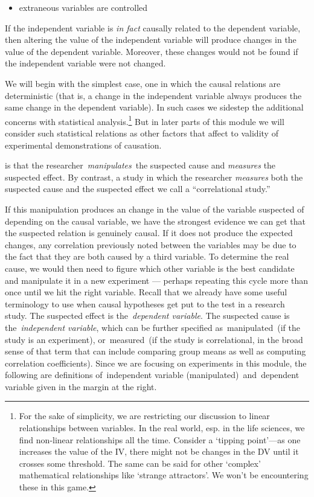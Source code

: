 \begin{refsection}
\begin{itemize}
\item extraneous variables are controlled

\end{itemize}

If the independent variable is \emph{in fact} causally related to the dependent variable, then altering the value of the independent variable will produce changes in the value of the dependent variable. Moreover, these changes would not be found if the independent variable were not changed.

We will begin with the simplest case, one in which the causal relations are deterministic (that is, a change in the independent variable always produces the same change in the dependent variable). In such cases we sidestep the additional concerns with statistical analysis.\footnote{For the sake of simplicity, we are restricting our discussion to linear relationships between variables. In the real world, esp. in the life sciences, we find non-linear relationships all the time. Consider a `tipping point'---as one increases the value of the IV, there might not be changes in the DV until it crosses some threshold. The same can be said for other `complex' mathematical relationships like `strange attractors'. We won't be encountering these in this game.} But in later parts of this module we will consider such statistical relations as other factors that affect to validity of experimental demonstrations of causation.

 is that the researcher \emph{manipulates} the suspected cause and \emph{measures} the suspected effect. By contrast, a study in which the researcher \emph{measures} both the suspected cause and the suspected effect we call a ``correlational study.'' 

If this manipulation produces an change in the value of the variable suspected of depending on the causal variable, we have the strongest evidence we can get that the suspected relation is genuinely causal. If it does not produce the expected changes, any correlation previously noted between the variables may be due to the fact that they are both caused by a third variable. To determine the real cause, we would then need to figure which other variable is the best candidate and manipulate it in a new experiment --- perhaps repeating this cycle more than once until we hit the right variable.
Recall that we already have some useful terminology to use when causal hypotheses get put to the test in a research study. The suspected effect is the \emph{dependent variable}. The suspected cause is the \emph{independent variable}, which can be further specified as manipulated (if the study is an experiment), or measured (if the study is correlational, in the broad sense of that term that can include comparing group means as well as computing correlation coefficients). Since we are focusing on experiments in this module, the following are definitions of independent variable (manipulated) and dependent variable given in the margin at the right.


\end{refsection}
